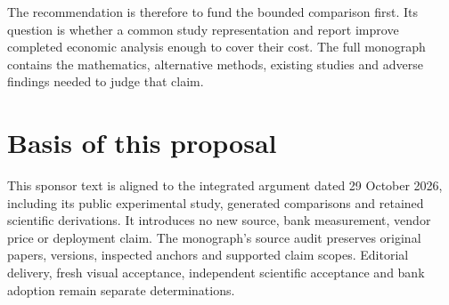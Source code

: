 The recommendation is therefore to fund the bounded comparison first. Its
question is whether a common study representation and report improve
completed economic analysis enough to cover their cost. The full monograph
contains the mathematics, alternative methods, existing studies and adverse
findings needed to judge that claim.

\section*{Basis of this proposal}
This sponsor text is aligned to the integrated argument dated
29 October 2026, including its public experimental study, generated
comparisons and retained scientific derivations. It introduces no new source, bank measurement,
vendor price or deployment claim. The monograph's source audit preserves
original papers, versions, inspected anchors and supported claim scopes.
Editorial delivery, fresh visual acceptance, independent scientific
acceptance and bank adoption remain separate determinations.
